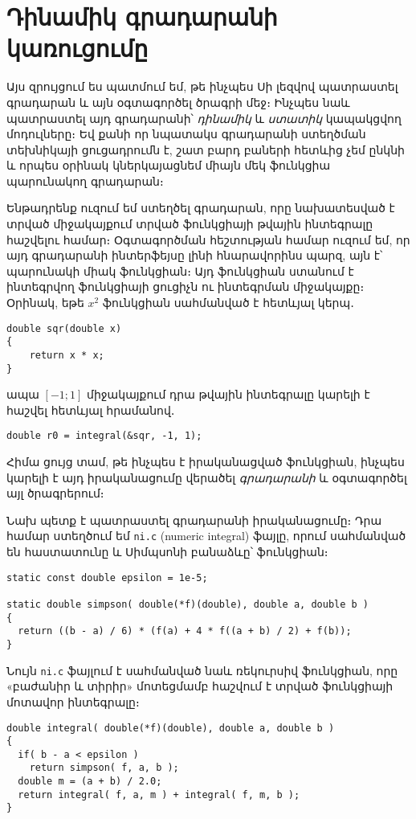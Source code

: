 \chapter{Դինամիկ գրադարանի կառուցումը}

Այս զրույցում ես պատմում եմ, թե ինչպես Սի լեզվով պատրաստել
գրադարան և այն օգտագործել ծրագրի մեջ։ Ինչպես նաև պատրաստել
այդ գրադարանի՝ \emph{դինամիկ} և \emph{ստատիկ} կապակցվող
մոդուլները։ Եվ քանի որ նպատակս գրադարանի ստեղծման տեխնիկայի
ցուցադրումն է, շատ բարդ բաների հետևից չեմ ընկնի և որպես
օրինակ կներկայացնեմ միայն մեկ ֆունկցիա պարունակող գրադարան։

Ենթադրենք ուզում եմ ստեղծել գրադարան, որը նախատեսված է տրված
միջակայքում տրված ֆունկցիայի թվային ինտեգրալը հաշվելու համար։
Օգտագործման հեշտության համար ուզում եմ, որ այդ գրադարանի
ինտերֆեյսը լինի հնարավորինս պարզ, այն է՝ պարունակի միակ
 ֆունկցիան։ Այդ ֆունկցիան ստանում է ինտեգրվող
ֆունկցիայի ցուցիչն ու ինտեգրման միջակայքը։ Օրինակ, եթե \(x^2\)
ֆունկցիան սահմանված է հետևյալ կերպ․

\begin{Verbatim}
double sqr(double x)
{
    return x * x;
}
\end{Verbatim}

ապա \([-1;1]\) միջակայքում դրա թվային ինտեգրալը կարելի է հաշվել
հետևյալ հրամանով․

\begin{Verbatim}
double r0 = integral(&sqr, -1, 1);
\end{Verbatim}

Հիմա ցույց տամ, թե ինչպես է իրականացված 
ֆունկցիան, ինչպես կարելի է այդ իրականացումը վերածել
\emph{գրադարանի} և օգտագործել այլ ծրագրերում։

Նախ պետք է պատրաստել գրադարանի իրականացումը։ Դրա համար ստեղծում
եմ \texttt{ni.c} (numeric integral) ֆայլը, որում սահմանված են
 հաստատունը և Սիմպսոնի բանաձևը՝ 
ֆունկցիան։

\begin{Verbatim}
static const double epsilon = 1e-5;

static double simpson( double(*f)(double), double a, double b )
{
  return ((b - a) / 6) * (f(a) + 4 * f((a + b) / 2) + f(b));
}
\end{Verbatim}

Նույն \texttt{ni.c} ֆայլում է սահմանված նաև 
ռեկուրսիվ ֆունկցիան, որը «բաժանիր և տիրիր» մոտեցմամբ հաշվում
է տրված ֆունկցիայի մոտավոր ինտեգրալը։

\begin{Verbatim}
double integral( double(*f)(double), double a, double b )
{
  if( b - a < epsilon )
    return simpson( f, a, b );
  double m = (a + b) / 2.0;
  return integral( f, a, m ) + integral( f, m, b );
}
\end{Verbatim}

